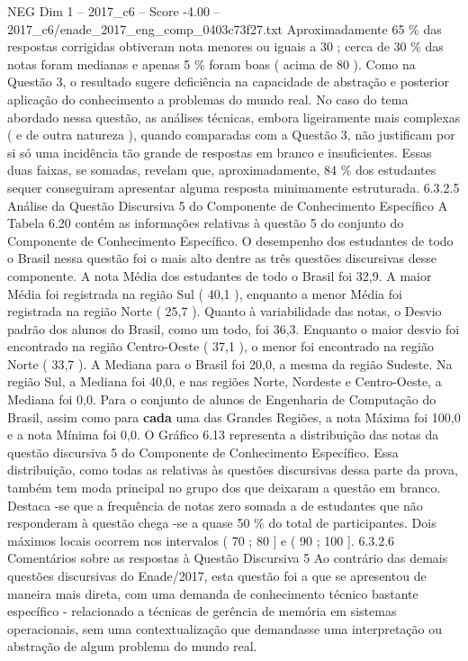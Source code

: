 \begin{textsample}{NEG Dim 1 – 2017\_c6 – Score -4.00 – 2017\_c6/enade\_2017\_eng\_comp\_0403c73f27.txt}
Aproximadamente 65 \% das respostas corrigidas obtiveram nota menores ou iguais a 30 ; cerca de 30 \% das notas foram medianas e apenas 5 \% foram boas ( acima de 80 ).
Como na Questão 3, o resultado sugere deficiência na capacidade de abstração e posterior aplicação do conhecimento a problemas do mundo real.
No caso do tema abordado nessa questão, as análises técnicas, embora ligeiramente mais complexas ( e de outra natureza ), quando comparadas com a Questão 3, não justificam por si só uma incidência tão grande de respostas em branco e insuficientes.
Essas duas faixas, se somadas, revelam que, aproximadamente, 84 \% dos estudantes sequer conseguiram apresentar alguma resposta minimamente estruturada. 6.3.2.5 Análise da Questão Discursiva 5 do Componente de Conhecimento Específico A Tabela 6.20 contém as informações relativas à questão 5 do conjunto do Componente de Conhecimento Específico.
O desempenho dos estudantes de todo o Brasil nessa questão foi o mais alto dentre as três questões discursivas desse componente.
A nota Média dos estudantes de todo o Brasil foi 32,9.
A maior Média foi registrada na região Sul ( 40,1 ), enquanto a menor Média foi registrada na região Norte ( 25,7 ).
Quanto à variabilidade das notas, o Desvio padrão dos alunos do Brasil, como um todo, foi 36,3.
Enquanto o maior desvio foi encontrado na região Centro-Oeste ( 37,1 ), o menor foi encontrado na região Norte ( 33,7 ).
A Mediana para o Brasil foi 20,0, a mesma da região Sudeste.
Na região Sul, a Mediana foi 40,0, e nas regiões Norte, Nordeste e Centro-Oeste, a Mediana foi 0,0.
Para o conjunto de alunos de Engenharia de Computação do Brasil, assim como para \textbf{cada} uma das Grandes Regiões, a nota Máxima foi 100,0 e a nota Mínima foi 0,0.
O Gráfico 6.13 representa a distribuição das notas da questão discursiva 5 do Componente de Conhecimento Específico.
Essa distribuição, como todas as relativas às questões discursivas dessa parte da prova, também tem moda principal no grupo dos que deixaram a questão em branco.
Destaca -se que a frequência de notas zero somada a de estudantes que não responderam à questão chega -se a quase 50 \% do total de participantes.
Dois máximos locais ocorrem nos intervalos ( 70 ; 80 ] e ( 90 ; 100 ]. 6.3.2.6 Comentários sobre as respostas à Questão Discursiva 5 Ao contrário das demais questões discursivas do Enade/2017, esta questão foi a que se apresentou de maneira mais direta, com uma demanda de conhecimento técnico bastante específico - relacionado a técnicas de gerência de memória em sistemas operacionais, sem uma contextualização que demandasse uma interpretação ou abstração de algum problema do mundo real.

\end{textsample}
